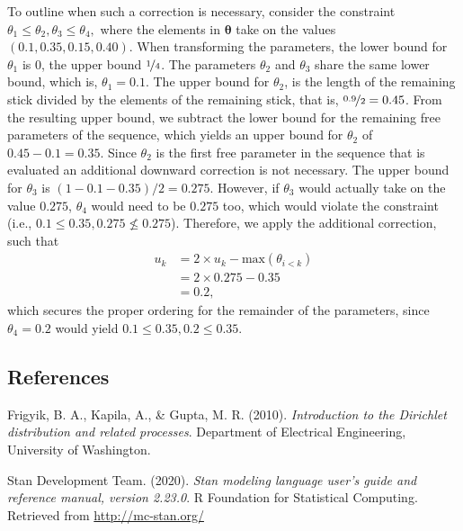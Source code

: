 \begin{appendix}
To outline when such a correction is necessary, consider the constraint
\(\theta_1 \leq \theta_2, \theta_3 \leq \theta_4,\) where the elements
in \(\boldsymbol{\theta}\) take on the values
\((0.1, 0.35, 0.15, 0.40)\). When transforming the parameters, the lower
bound for \(\theta_1\) is \(0\), the upper bound \(\nicefrac{1}{4}\).
The parameters \(\theta_2\) and \(\theta_3\) share the same lower bound,
which is, \(\theta_1 = 0.1\). The upper bound for \(\theta_2\), is the
length of the remaining stick divided by the elements of the remaining
stick, that is, \(\nicefrac{0.9}{2} = 0.45\). From the resulting upper
bound, we subtract the lower bound for the remaining free parameters of
the sequence, which yields an upper bound for \(\theta_2\) of
\(0.45 - 0.1 = 0.35\). Since \(\theta_2\) is the first free parameter in
the sequence that is evaluated an additional downward correction is not
necessary. The upper bound for \(\theta_3\) is
\((1 - 0.1 - 0.35)/2 = 0.275\). However, if \(\theta_3\) would actually
take on the value \(0.275\), \(\theta_4\) would need to be \(0.275\)
too, which would violate the constraint (i.e.,
\(0.1 \leq 0.35, 0.275 \nleq 0.275\)). Therefore, we apply the
additional correction, such that \begin{align}
  u_k &= 2 \times u_k - \text{max}(\theta_{i < k}) \\
      &= 2 \times 0.275 - 0.35 \\
      &= 0.2,
\end{align} which secures the proper ordering for the remainder of the
parameters, since \(\theta_4 = 0.2\) would yield
\(0.1 \leq 0.35, 0.2 \leq 0.35\).

\hypertarget{references}{%
\subsection{References}\label{references}}

\begingroup
\setlength{\parindent}{-0.5in}
\setlength{\leftskip}{0.5in}

\hypertarget{refs}{}
\begin{cslreferences}
\leavevmode\hypertarget{ref-frigyik2010introduction}{}%
Frigyik, B. A., Kapila, A., \& Gupta, M. R. (2010). \emph{Introduction
to the Dirichlet distribution and related processes}. Department of
Electrical Engineering, University of Washington.

\leavevmode\hypertarget{ref-stan2020}{}%
Stan Development Team. (2020). \emph{Stan modeling language user's guide
and reference manual, version 2.23.0}. R Foundation for Statistical
Computing. Retrieved from \url{http://mc-stan.org/}
\end{cslreferences}

\endgroup
\end{appendix}
